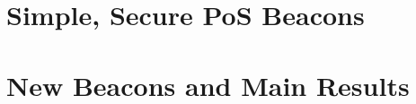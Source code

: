 \chapter{Simple, Secure PoS Beacons}\label{sec:xorgames-intro}


\chapter{New Beacons and Main Results}
\label{sec:xorgames-model}

% 

% 



% 



